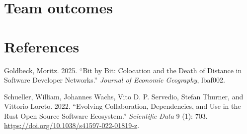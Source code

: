 \documentclass[
  12pt,
]{article}
\newlength{\cslhangindent}
\newenvironment{CSLReferences}[2] %
 {\begin{list}{}{%
  \setlength{\itemindent}{0pt}
  \setlength{\leftmargin}{0pt}
  \setlength{\parsep}{0pt}
  \ifodd #1
   \setlength{\leftmargin}{\cslhangindent}
   \setlength{\itemindent}{-1\cslhangindent}
  \fi
  \setlength{\itemsep}{#2\baselineskip}}}
 {\end{list}}
\begin{document}
\section{Team outcomes}\label{sec-outcomes}

\section{References}\label{sec-references}

\label{refs}
\begin{CSLReferences}{1}{0}
Goldbeck, Moritz. 2025. {``Bit by Bit: Colocation and the Death of
Distance in Software Developer Networks.''} \emph{Journal of Economic
Geography}, lbaf002.

Schueller, William, Johannes Wachs, Vito D. P. Servedio, Stefan Thurner,
and Vittorio Loreto. 2022. {``Evolving Collaboration, Dependencies, and
Use in the Rust Open Source Software Ecosystem.''} \emph{Scientific
Data} 9 (1): 703. \url{https://doi.org/10.1038/s41597-022-01819-z}.

\end{CSLReferences}
\end{document}

